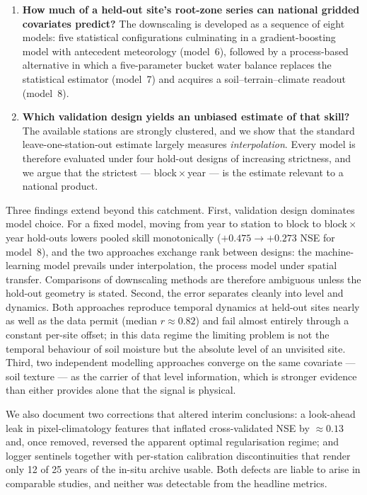 \documentclass[11pt,a4paper]{article}
\begin{document}
\begin{enumerate}
\item \textbf{How much of a held-out site's root-zone series can national
  gridded covariates predict?} The downscaling is developed as a sequence of
  eight models: five statistical configurations culminating in a
  gradient-boosting model with antecedent meteorology (model~6), followed by a
  process-based alternative in which a five-parameter bucket water balance
  replaces the statistical estimator (model~7) and acquires a
  soil--terrain--climate readout (model~8).
\item \textbf{Which validation design yields an unbiased estimate of that
  skill?} The available stations are strongly clustered, and we show that the
  standard leave-one-station-out estimate largely measures
  \emph{interpolation}. Every model is therefore evaluated under four hold-out
  designs of increasing strictness, and we argue that the strictest ---
  block\,$\times$\,year --- is the estimate relevant to a national product.
\end{enumerate}

Three findings extend beyond this catchment. First, validation design
dominates model choice. For a fixed model, moving from year to station to
block to block\,$\times$\,year hold-outs lowers pooled skill monotonically
($+0.475 \to +0.273$ NSE for model~8), and the two approaches exchange rank
between designs: the machine-learning model prevails under interpolation, the
process model under spatial transfer. Comparisons of downscaling methods are
therefore ambiguous unless the hold-out geometry is stated. Second, the error
separates cleanly into level and dynamics. Both approaches reproduce temporal
dynamics at held-out sites nearly as well as the data permit (median
$r \approx 0.82$) and fail almost entirely through a constant per-site offset;
in this data regime the limiting problem is not the temporal behaviour of soil
moisture but the absolute level of an unvisited site. Third, two independent
modelling approaches converge on the same covariate --- soil texture --- as
the carrier of that level information, which is stronger evidence than either
provides alone that the signal is physical.

We also document two corrections that altered interim conclusions: a
look-ahead leak in pixel-climatology features that inflated cross-validated
NSE by ${\approx}0.13$ and, once removed, reversed the apparent optimal
regularisation regime; and logger sentinels together with per-station
calibration discontinuities that render only 12 of 25 years of the in-situ
archive usable. Both defects are liable to arise in comparable studies, and
neither was detectable from the headline metrics.
\end{document}
